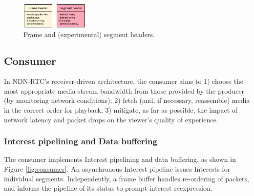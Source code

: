 \documentclass{icn/sig-alternate-2013} %
\newcommand{\ndnrtcName}{NDN-RTC} %
\begin{document}

%

%


\begin{figure}[t!]
\centering
\includegraphics[width=0.3\textwidth]{data-struct}
\vspace{-4pt}
\caption{Frame and (experimental) segment headers.}
\label{fig:data-struct}
\end{figure}


\subsection{Consumer}
\label{sec:consumer}

In \ndnrtcName{}'s receiver-driven architecture, the consumer aims to 1) choose the most appropriate media stream bandwidth from those provided by the producer (by monitoring network conditions); 2) fetch (and, if necessary, reassemble) media in the correct order for playback; 3) mitigate, as far as possible, the impact of network latency and packet drops on the viewer's quality of experience.  

\subsubsection{Interest pipelining and Data buffering}

The consumer implements Interest pipelining and data buffering, as shown in Figure \ref{fig:consumer}. %
An asynchronous Interest pipeline issues Interests for individual segments. Independently, a frame buffer handles re-ordering of packets, and informs the pipeline of its status to prompt interest reexpression.
\end{document}
